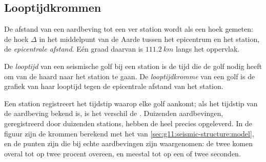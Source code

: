 \subsection{Looptijdkrommen}

De afstand van een aardbeving tot een ver station wordt als een hoek gemeten: de
hoek $\Delta$ in het middelpunt van de Aarde tussen het epicentrum en het station,
de \emph{epicentrale afstand}. Eén graad daarvan is
$\qty{111.2}{km}$ langs het oppervlak.

\begin{definition}\label{def:g11:seismic-structure:travel-time}
De \emph{looptijd} van een seismische golf bij een station is de
tijd die de golf nodig heeft om van de haard naar het station te gaan. De
\emph{looptijdkromme} van een golf is de grafiek van haar
looptijd tegen de epicentrale afstand van het station.
\end{definition}

Een station registreert het tijdstip waarop elke golf aankomt; als het tijdstip
van de aardbeving bekend is, is het verschil de . Duizenden aardbevingen,
geregistreerd door duizenden stations, hebben de  heel precies
opgeleverd. In de figuur zijn de krommen berekend met het  van \cref{sec:g11:seismic-structure:model}, en de punten zijn 
die bij echte aardbevingen zijn waargenomen: de twee komen overal tot op twee
procent overeen, en meestal tot op een of twee seconden.

